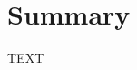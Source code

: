 \documentclass[journal abbreviation, manuscript]{copernicus}
\begin{document}
\section{Summary}
\label{sec: summary}


\conclusions  %
TEXT












\appendix
\section{}    %

\subsection{}     %


\noappendix       %



\end{document}
